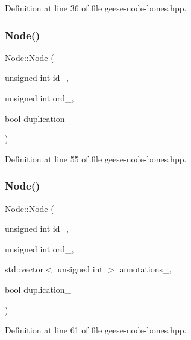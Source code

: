 Definition at line 36 of file geese-\/node-\/bones.\+hpp.

\mbox{\label{class_node_a9983fdcbdddeae8862fbd266536f5cff}} 
\subsubsection{\texorpdfstring{Node()}{Node()}\hspace{0.1cm}{\footnotesize\ttfamily [2/5]}}
{\footnotesize\ttfamily Node\+::\+Node (\begin{DoxyParamCaption}\item[{unsigned int}]{id\+\_\+,  }\item[{unsigned int}]{ord\+\_\+,  }\item[{bool}]{duplication\+\_\+ }\end{DoxyParamCaption})\hspace{0.3cm}{\ttfamily [inline]}}



Definition at line 55 of file geese-\/node-\/bones.\+hpp.

\mbox{\label{class_node_a0c9bb1827ebcdb298c05e9b9bf04aac8}} 
\subsubsection{\texorpdfstring{Node()}{Node()}\hspace{0.1cm}{\footnotesize\ttfamily [3/5]}}
{\footnotesize\ttfamily Node\+::\+Node (\begin{DoxyParamCaption}\item[{unsigned int}]{id\+\_\+,  }\item[{unsigned int}]{ord\+\_\+,  }\item[{std\+::vector$<$ unsigned int $>$}]{annotations\+\_\+,  }\item[{bool}]{duplication\+\_\+ }\end{DoxyParamCaption})\hspace{0.3cm}{\ttfamily [inline]}}



Definition at line 61 of file geese-\/node-\/bones.\+hpp.

\mbox{\label{class_node_a7541702bb12f9dae3f6cbf83bddaed2a}} 
